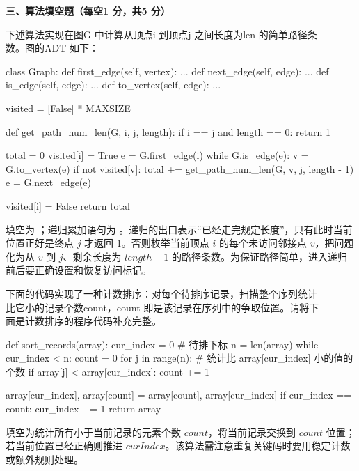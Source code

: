 \textbf{三、算法填空题（每空1 分，共5 分）}
\begin{question}
下述算法实现在图G 中计算从顶点i 到顶点j 之间长度为len 的简单路径条\\
数。图的ADT 如下：
\begin{pycode}
class Graph:
    def first_edge(self, vertex): ...
    def next_edge(self, edge): ...
    def is_edge(self, edge): ...
    def to_vertex(self, edge): ...


visited = [False] * MAXSIZE


def get_path_num_len(G, i, j, length):
    if i == j and length == 0:
        return 1

    total = 0
    visited[i] = True
    e = G.first_edge(i)
    while G.is_edge(e):
        v = G.to_vertex(e)
        if not visited[v]:
            total += get_path_num_len(G, v, j, length - 1)
        e = G.next_edge(e)

    visited[i] = False
    return total
\end{pycode}

\begin{solution}
填空为 \texttt{}；递归累加语句为 \texttt{}。递归的出口表示“已经走完规定长度”，只有此时当前位置正好是终点 $j$ 才返回 $1$。否则枚举当前顶点 $i$ 的每个未访问邻接点 $v$，把问题化为从 $v$ 到 $j$、剩余长度为 $length-1$ 的路径条数。为保证路径简单，进入递归前后要正确设置和恢复访问标记。
\end{solution}
\end{question}

\begin{question}
下面的代码实现了一种计数排序：对每个待排序记录，扫描整个序列统计\\
比它小的记录个数count，count 即是该记录在序列中的争取位置。请将下\\
面是计数排序的程序代码补充完整。
\begin{pycode}
def sort_records(array):
    cur_index = 0              # 待排下标
    n = len(array)
    while cur_index < n:
        count = 0
        for j in range(n):     # 统计比 array[cur_index] 小的值的个数
            if array[j] < array[cur_index]:
                count += 1

        array[cur_index], array[count] = array[count], array[cur_index]
        if cur_index == count:
            cur_index += 1
    return array
\end{pycode}

\begin{solution}
填空为统计所有小于当前记录的元素个数 $count$，将当前记录交换到 $count$ 位置；若当前位置已经正确则推进 $curIndex$。该算法需注意重复关键码时要用稳定计数或额外规则处理。
\end{solution}
\end{question}

